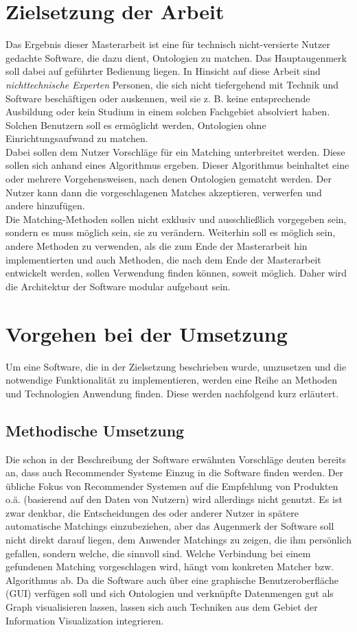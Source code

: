 \section{Zielsetzung der Arbeit}
Das Ergebnis dieser Masterarbeit ist eine für technisch nicht-versierte Nutzer
gedachte Software, die dazu dient, Ontologien zu matchen. Das Hauptaugenmerk
soll dabei auf geführter Bedienung liegen. In Hinsicht auf diese Arbeit sind
\textit{nichttechnische Experten} Personen, die sich nicht tiefergehend mit
Technik und Software beschäftigen oder auskennen, weil sie z. B. keine
entsprechende Ausbildung oder kein Studium in einem solchen Fachgebiet
absolviert haben.
Solchen Benutzern soll es ermöglicht werden, Ontologien ohne Einrichtungsaufwand
zu matchen.\\
Dabei sollen dem Nutzer Vorschläge für ein Matching unterbreitet werden. Diese
sollen sich anhand eines Algorithmus ergeben. Dieser Algorithmus
beinhaltet eine oder mehrere Vorgehensweisen, nach denen Ontologien gematcht werden. Der Nutzer
kann dann die vorgeschlagenen Matches akzeptieren, verwerfen und andere hinzufügen.\\
Die Matching-Methoden sollen nicht exklusiv und ausschließlich vorgegeben sein,
sondern es muss möglich sein, sie zu verändern. Weiterhin soll es möglich sein,
andere  Methoden zu verwenden, als die zum Ende der Masterarbeit hin
implementierten und auch Methoden, die nach dem Ende der Masterarbeit entwickelt
werden, sollen Verwendung finden können, soweit möglich. Daher wird die
Architektur der Software modular aufgebaut sein.

\section{Vorgehen bei der Umsetzung}
Um eine Software, die in der Zielsetzung beschrieben wurde, umzusetzen und die
notwendige Funktionalität zu implementieren, werden eine Reihe an Methoden und
Technologien Anwendung finden. Diese werden nachfolgend kurz erläutert.

\subsection{Methodische Umsetzung}
Die schon in der Beschreibung der
Software erwähnten Vorschläge deuten bereits an, dass auch Recommender Systeme
Einzug in die Software finden werden. Der übliche Fokus von Recommender Systemen
auf die Empfehlung von Produkten o.ä. (basierend auf den Daten von Nutzern) wird
allerdings nicht genutzt. Es ist zwar denkbar, die Entscheidungen des oder
anderer Nutzer in spätere automatische Matchings einzubeziehen, aber das
Augenmerk der Software soll nicht direkt darauf liegen, dem Anwender Matchings
zu zeigen, die ihm persönlich gefallen, sondern welche, die sinnvoll sind.
Welche Verbindung bei einem gefundenen Matching vorgeschlagen wird, hängt vom
konkreten Matcher bzw. Algorithmus ab. Da die Software auch über eine graphische
Benutzeroberfläche (GUI) verfügen soll und sich Ontologien und verknüpfte
Datenmengen gut als Graph visualisieren lassen, lassen sich auch Techniken aus
dem Gebiet der Information Visualization integrieren.

